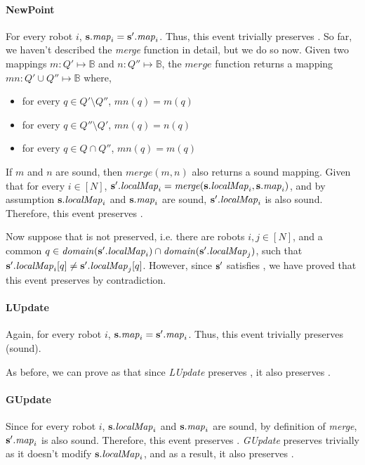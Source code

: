 \paragraph{NewPoint}
For every robot $i$, ${\textbf{s}}.\mathit{map}_i = {\textbf{s}}'.\mathit{map}_i$. Thus, this event trivially preserves . So far, we haven't described the \emph{merge} function in detail, but we do so now. Given two mappings $m:Q'\mapsto \mathbb{B}$ and $n:Q''\mapsto \mathbb{B}$, the $\mathit{merge}$ function returns a mapping $\mathit{mn}: Q'\cup Q'' \mapsto \mathbb{B}$ where, \begin{itemize}
      \item for every $q \in Q'\setminus Q''$, $\mathit{mn}(q) = m(q)$
      \item for every $q \in Q''\setminus Q'$, $\mathit{mn}(q) = n(q)$
      \item for every $q \in Q \cap Q''$, $\mathit{mn}(q) = m(q) $
\end{itemize}
If $m$ and $n$ are sound, then $\mathit{merge}(m,n)$ also returns a sound mapping. Given that for every $i\in [N]$, ${\textbf{s}}'.\mathit{localMap}_i = \mathit{merge}({\textbf{s}}.\mathit{localMap}_i,{\textbf{s}}.\mathit{map}_i)$, and by assumption ${\textbf{s}}.\mathit{localMap}_i$ and ${\textbf{s}}.\mathit{map}_i$ are sound, ${\textbf{s}}'.\mathit{localMap}_i$ is also sound. Therefore, this event preserves .

Now suppose that  is not preserved, i.e. there are robots  $i, j \in [N]$, and a common $q \in \mathit{domain}({\textbf{s}}'.\mathit{localMap}_i)\cap\mathit{domain}({\textbf{s}}'.\mathit{localMap}_j)$, such that ${\textbf{s}}'.\mathit{localMap}_i[q] \neq {\textbf{s}}'.\mathit{localMap}_j[q]$. However, since ${\textbf{s}}'$ satisfies , we have proved that this event preserves  by contradiction.

\paragraph{LUpdate}
Again, for every robot $i$, ${\textbf{s}}.\mathit{map}_i = {\textbf{s}}'.\mathit{map}_i$. Thus, this event trivially preserves \inv(sound).

As before, we can prove as that since \emph{LUpdate} preserves , it also preserves .

\paragraph{GUpdate}
Since for every robot $i$, ${\textbf{s}}.\mathit{localMap}_i$ and ${\textbf{s}}.\mathit{map}_i$ are sound, by definition of \emph{merge},  ${\textbf{s}}'.\mathit{map}_i$ is also sound. Therefore, this event preserves . \emph{GUpdate} preserves  trivially as it doesn't modify ${\textbf{s}}.\mathit{localMap}_i$, and as a result, it also preserves .


